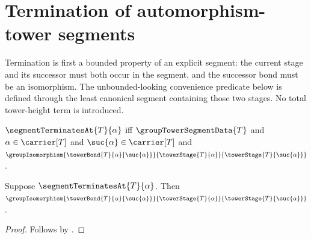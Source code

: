 


\section{Termination of automorphism-tower segments}

Termination is first a bounded property of an explicit segment: the current
stage and its successor must both occur in the segment, and the successor bond
must be an isomorphism.  The unbounded-looking convenience predicate below is
defined through the least canonical segment containing those two stages.  No
total tower-height term is introduced.

\begin{definition}\label{segment_terminates_at}
    $\segmentTerminatesAt{T}{\alpha}$ iff
        $\groupTowerSegmentData{T}$ and
        $\alpha\in\carrier[T]$ and
        $\suc{\alpha}\in\carrier[T]$ and
        $\groupIsomorphism{\towerBond{T}{\alpha}{\suc{\alpha}}}
            {\towerStage{T}{\alpha}}
            {\towerStage{T}{\suc{\alpha}}}$.
\end{definition}

\begin{proposition}\label{segment_terminates_at_isomorphism}
    Suppose $\segmentTerminatesAt{T}{\alpha}$.
    Then $\groupIsomorphism{\towerBond{T}{\alpha}{\suc{\alpha}}}
        {\towerStage{T}{\alpha}}
        {\towerStage{T}{\suc{\alpha}}}$.
\end{proposition}
\begin{proof}
    Follows by .
\end{proof}


